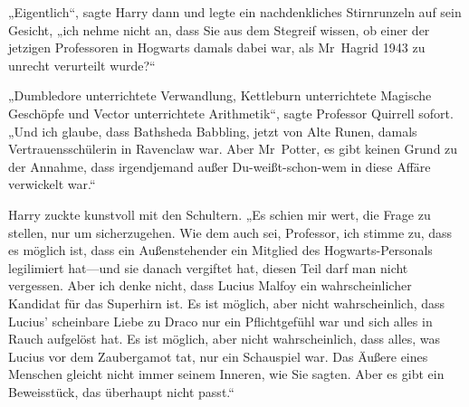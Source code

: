„Eigentlich“, sagte Harry dann und legte ein nachdenkliches Stirnrunzeln auf sein Gesicht, „ich nehme nicht an, dass Sie aus dem Stegreif wissen, ob einer der jetzigen Professoren in Hogwarts damals dabei war, als Mr~Hagrid 1943 zu unrecht verurteilt wurde?“

„Dumbledore unterrichtete Verwandlung, Kettleburn unterrichtete Magische Geschöpfe und Vector unterrichtete Arithmetik“, sagte Professor Quirrell sofort. „Und ich glaube, dass Bathsheda Babbling, jetzt von Alte Runen, damals Vertrauensschülerin in Ravenclaw war. Aber Mr~Potter, es gibt keinen Grund zu der Annahme, dass irgendjemand außer Du-weißt-schon-wem in diese Affäre verwickelt war.“

Harry zuckte kunstvoll mit den Schultern. „Es schien mir wert, die Frage zu stellen, nur um sicherzugehen. Wie dem auch sei, Professor, ich stimme zu, dass es möglich ist, dass ein Außenstehender ein Mitglied des Hogwarts-Personals legilimiert hat—und sie danach vergiftet hat, diesen Teil darf man nicht vergessen. Aber ich denke nicht, dass Lucius Malfoy ein wahrscheinlicher Kandidat für das Superhirn ist. Es ist möglich, aber nicht wahrscheinlich, dass Lucius' scheinbare Liebe zu Draco nur ein Pflichtgefühl war und sich alles in Rauch aufgelöst hat. Es ist möglich, aber nicht wahrscheinlich, dass alles, was Lucius vor dem Zaubergamot tat, nur ein Schauspiel war. Das Äußere eines Menschen gleicht nicht immer seinem Inneren, wie Sie sagten. Aber es gibt ein Beweisstück, das überhaupt nicht passt.“

